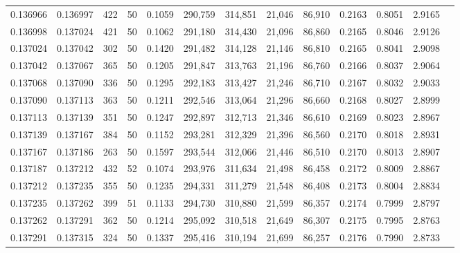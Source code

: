 \begin{tabular}{rrrrrrrrrrrrr}
0.136966 & 0.136997 &   422 &  50 &                                     0.1059 & 290,759 & 314,851 &  21,046 &  86,910 & 0.2163 & 0.8051 & 2.9165 \\
0.136998 & 0.137024 &   421 &  50 &                                     0.1062 & 291,180 & 314,430 &  21,096 &  86,860 & 0.2165 & 0.8046 & 2.9126 \\
0.137024 & 0.137042 &   302 &  50 &                                     0.1420 & 291,482 & 314,128 &  21,146 &  86,810 & 0.2165 & 0.8041 & 2.9098 \\
0.137042 & 0.137067 &   365 &  50 &                                     0.1205 & 291,847 & 313,763 &  21,196 &  86,760 & 0.2166 & 0.8037 & 2.9064 \\
0.137068 & 0.137090 &   336 &  50 &                                     0.1295 & 292,183 & 313,427 &  21,246 &  86,710 & 0.2167 & 0.8032 & 2.9033 \\
0.137090 & 0.137113 &   363 &  50 &                                     0.1211 & 292,546 & 313,064 &  21,296 &  86,660 & 0.2168 & 0.8027 & 2.8999 \\
0.137113 & 0.137139 &   351 &  50 &                                     0.1247 & 292,897 & 312,713 &  21,346 &  86,610 & 0.2169 & 0.8023 & 2.8967 \\
0.137139 & 0.137167 &   384 &  50 &                                     0.1152 & 293,281 & 312,329 &  21,396 &  86,560 & 0.2170 & 0.8018 & 2.8931 \\
0.137167 & 0.137186 &   263 &  50 &                                     0.1597 & 293,544 & 312,066 &  21,446 &  86,510 & 0.2170 & 0.8013 & 2.8907 \\
0.137187 & 0.137212 &   432 &  52 &                                     0.1074 & 293,976 & 311,634 &  21,498 &  86,458 & 0.2172 & 0.8009 & 2.8867 \\
0.137212 & 0.137235 &   355 &  50 &                                     0.1235 & 294,331 & 311,279 &  21,548 &  86,408 & 0.2173 & 0.8004 & 2.8834 \\
0.137235 & 0.137262 &   399 &  51 &                                     0.1133 & 294,730 & 310,880 &  21,599 &  86,357 & 0.2174 & 0.7999 & 2.8797 \\
0.137262 & 0.137291 &   362 &  50 &                                     0.1214 & 295,092 & 310,518 &  21,649 &  86,307 & 0.2175 & 0.7995 & 2.8763 \\
0.137291 & 0.137315 &   324 &  50 &                                     0.1337 & 295,416 & 310,194 &  21,699 &  86,257 & 0.2176 & 0.7990 & 2.8733 \\

\end{tabular}
